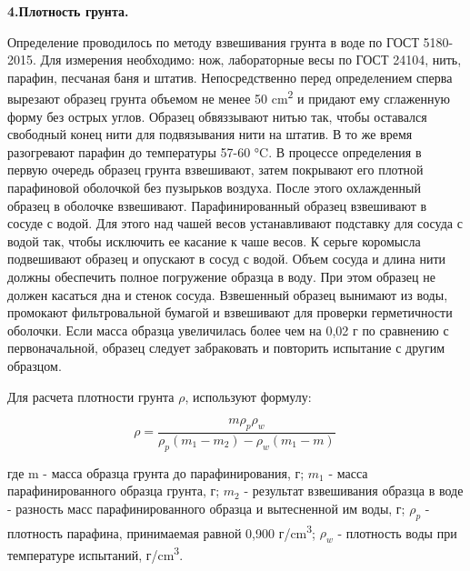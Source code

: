 \textbf{4.Плотность грунта.}

Определение проводилось по методу взвешивания грунта в воде по ГОСТ 5180-2015. Для измерения необходимо:
нож, лабораторные весы по ГОСТ 24104, нить, парафин, песчаная баня и штатив. Непосредственно перед 
определением сперва вырезают образец грунта объемом не менее 50 \si{\centi\meter^2} и придают ему сглаженную 
форму без острых углов. Образец обвяззывают нитью так, чтобы оставался свободный конец нити для 
подвязывания нити на штатив. В то же время разогревают парафин до температуры 57-60 \si{\degreeCelsius}.
В процессе определения в первую очередь образец грунта взвешивают, затем покрывают его плотной 
парафиновой оболочкой без пузырьков воздуха. После этого охлажденный образец в оболочке взвешивают. 
Парафинированный образец взвешивают в сосуде с водой.
Для этого над чашей весов устанавливают подставку для сосуда с водой так,
чтобы исключить ее касание к чаше весов. К серьге коромысла
подвешивают образец и опускают в сосуд с водой. Объем сосуда и длина
нити должны обеспечить полное погружение образца в воду. При этом
образец не должен касаться дна и стенок сосуда.
Взвешенный образец вынимают из воды, промокают
фильтровальной бумагой и взвешивают для проверки герметичности
оболочки. Если масса образца увеличилась более чем на 0,02 г по сравнению
с первоначальной, образец следует забраковать и повторить испытание с
другим образцом.

Для расчета плотности грунта  $\rho$,  используют формулу: 

\[
   \rho = \frac{m \rho_p \rho_w}{\rho_p (m_1-m_2)-\rho_w (m_1-m)}\
\]

где m - масса образца грунта до парафинирования, г;
$m_1$ - масса парафинированного образца грунта, г;
$m_2$ - результат взвешивания образца в воде - разность масс
парафинированного образца и вытесненной им воды, г; 
$\rho_p$ - плотность парафина, принимаемая равной 0,900 г/\si{\centi\meter^3};
$\rho_w$ - плотность воды при температуре испытаний,  г/\si{\centi\meter^3}.


